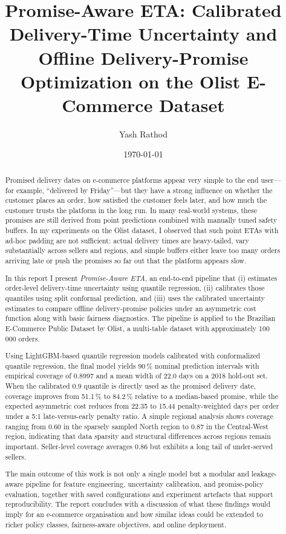 \documentclass[12pt]{article}
\title{Promise-Aware ETA: Calibrated Delivery-Time Uncertainty and Offline Delivery-Promise Optimization on the Olist E-Commerce Dataset}
\author{
  Yash Rathod
}
\date{\today}
\begin{document}
\maketitle

\begin{abstract}
Promised delivery dates on e-commerce platforms appear very simple to the end user---for example, ``delivered by Friday''---but they have a strong influence on whether the customer places an order, how satisfied the customer feels later, and how much the customer trusts the platform in the long run. In many real-world systems, these promises are still derived from point predictions combined with manually tuned safety buffers. In my experiments on the Olist dataset, I observed that such point ETAs with ad-hoc padding are not sufficient: actual delivery times are heavy-tailed, vary substantially across sellers and regions, and simple buffers either leave too many orders arriving late or push the promises so far out that the platform appears slow.

In this report I present \emph{Promise-Aware ETA}, an end-to-end pipeline that (i) estimates order-level delivery-time uncertainty using quantile regression, (ii) calibrates those quantiles using split conformal prediction, and (iii) uses the calibrated uncertainty estimates to compare offline delivery-promise policies under an asymmetric cost function along with basic fairness diagnostics. The pipeline is applied to the Brazilian E-Commerce Public Dataset by Olist, a multi-table dataset with approximately 100\,000 orders.

Using LightGBM-based quantile regression models calibrated with conformalized quantile regression, the final model yields 90\,\% nominal prediction intervals with empirical coverage of 0.8997 and a mean width of 22.0 days on a 2018 hold-out set. When the calibrated 0.9 quantile is directly used as the promised delivery date, coverage improves from 51.1\,\% to 84.2\,\% relative to a median-based promise, while the expected asymmetric cost reduces from 22.35 to 15.44 penalty-weighted days per order under a 5:1 late-versus-early penalty ratio. A simple regional analysis shows coverage ranging from 0.60 in the sparsely sampled North region to 0.87 in the Central-West region, indicating that data sparsity and structural differences across regions remain important. Seller-level coverage averages 0.86 but exhibits a long tail of under-served sellers.

The main outcome of this work is not only a single model but a modular and leakage-aware pipeline for feature engineering, uncertainty calibration, and promise-policy evaluation, together with saved configurations and experiment artefacts that support reproducibility. The report concludes with a discussion of what these findings would imply for an e-commerce organisation and how similar ideas could be extended to richer policy classes, fairness-aware objectives, and online deployment.
\end{abstract}
\end{document}
